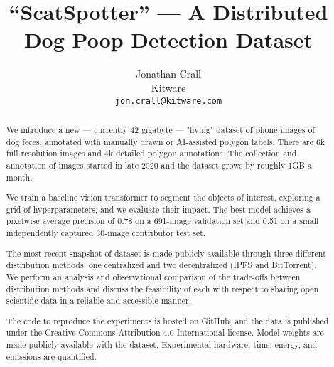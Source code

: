 \documentclass[10pt,twocolumn,letterpaper]{article}
\begin{document}
\title{``ScatSpotter'' --- A Distributed Dog Poop Detection Dataset}

\author{Jonathan Crall\\
Kitware\\
{\tt\small jon.crall@kitware.com}
}
\maketitle

\begin{abstract}

We introduce a new --- currently 42 gigabyte --- "living" dataset of phone images of dog feces, annotated with manually drawn or AI-assisted polygon labels. There are 6k full resolution images and 4k detailed polygon annotations. The collection and annotation of images started in late 2020 and the dataset grows by roughly 1GB a month. 

We train a baseline vision transformer to segment the objects of interest, exploring a grid of hyperparameters, and we evaluate their impact.  The best model achieves a pixelwise average precision of 0.78 on a 691-image validation set and 0.51 on a small independently captured 30-image contributor test set.

The most recent snapshot of dataset is made publicly available through three different distribution methods: one centralized and two decentralized (IPFS and BitTorrent).  We perform an analysis and observational comparison of the trade-offs between distribution methods and discuss the feasibility of each with respect to sharing open scientific data in a reliable and accessible manner.

The code to reproduce the experiments is hosted on GitHub, and the data is published under the Creative Commons Attribution 4.0 International license.  Model weights are made publicly available with the dataset. Experimental hardware, time, energy, and emissions are quantified.

\end{abstract}
\end{document}
